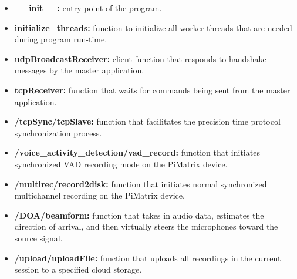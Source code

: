 \documentclass[hidelinks,12pt]{report} %
\begin{document}
	\begin{itemize}
		\item{\textbf{\_\_init\_\_: }}
		entry point of the program.
		\item{\textbf{initialize\_threads: }}
		function to initialize all worker threads that are needed during program run-time.
		\item{\textbf{udpBroadcastReceiver: }}
		client function that responds to handshake messages by the master application.
		\item{\textbf{tcpReceiver: }}
		function that waits for commands being sent from the master application.
		\item{\textbf{/tcpSync/tcpSlave: }}
		function that facilitates the precision time protocol synchronization process.  
		\item{\textbf{/voice\_activity\_detection/vad\_record: }}
		function that initiates synchronized VAD recording mode on the PiMatrix device.
		\item{\textbf{/multirec/record2disk: }}
		function that initiates normal synchronized multichannel recording on the PiMatrix device.
		\item{\textbf{/DOA/beamform: }}
		function that takes in audio data, estimates the direction of arrival, and then virtually steers the microphones toward the source signal. 
		\item{\textbf{/upload/uploadFile: }}
		function that uploads all recordings in the current session to a specified cloud storage.

		
	\end{itemize}
\end{document}
